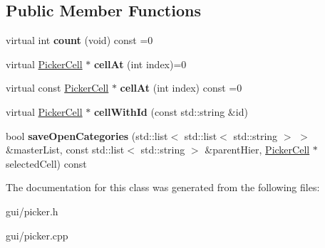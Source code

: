 \subsection*{Public Member Functions}
\begin{DoxyCompactItemize}
\item 
virtual int {\bfseries count} (void) const =0\hypertarget{classPickerCells_afbce8afa968381c97bb3e402ea175243}{}\label{classPickerCells_afbce8afa968381c97bb3e402ea175243}

\item 
virtual \hyperlink{classPickerCell}{Picker\+Cell} $\ast$ {\bfseries cell\+At} (int index)=0\hypertarget{classPickerCells_a582dbbfc88c050488e3a59bf73f3d7dc}{}\label{classPickerCells_a582dbbfc88c050488e3a59bf73f3d7dc}

\item 
virtual const \hyperlink{classPickerCell}{Picker\+Cell} $\ast$ {\bfseries cell\+At} (int index) const =0\hypertarget{classPickerCells_a7f85572a9f47f7a71e77a66d784dbe88}{}\label{classPickerCells_a7f85572a9f47f7a71e77a66d784dbe88}

\item 
virtual \hyperlink{classPickerCell}{Picker\+Cell} $\ast$ {\bfseries cell\+With\+Id} (const std\+::string \&id)\hypertarget{classPickerCells_a9d35d3252da08e7746b052c3b9b8ebd2}{}\label{classPickerCells_a9d35d3252da08e7746b052c3b9b8ebd2}

\item 
bool {\bfseries save\+Open\+Categories} (std\+::list$<$ std\+::list$<$ std\+::string $>$ $>$ \&master\+List, const std\+::list$<$ std\+::string $>$ \&parent\+Hier, \hyperlink{classPickerCell}{Picker\+Cell} $\ast$selected\+Cell) const \hypertarget{classPickerCells_a844813678d8026c9ebb76a6654c5ca5b}{}\label{classPickerCells_a844813678d8026c9ebb76a6654c5ca5b}

\end{DoxyCompactItemize}


The documentation for this class was generated from the following files\+:\begin{DoxyCompactItemize}
\item 
gui/picker.\+h\item 
gui/picker.\+cpp\end{DoxyCompactItemize}
